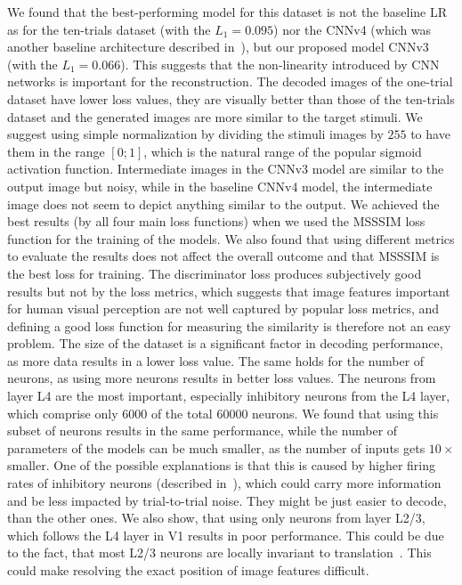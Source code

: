 We found that the best-performing model for this dataset is not the baseline LR as for the ten-trials dataset (with the $L_1 = 0.095$) nor the CNNv4 (which was another baseline architecture described in~\citep{zhang2020reconstruction}), but our proposed model CNNv3 (with the $L_1=0.066$). This suggests that the non-linearity introduced by CNN networks is important for the reconstruction.
The decoded images of the one-trial dataset have lower loss values, they are visually better than those of the ten-trials dataset and the generated images are more similar to the target stimuli. We suggest using simple normalization by dividing the stimuli images by $255$ to have them in the range $[0;1]$, which is the natural range of the popular sigmoid activation function.
Intermediate images in the CNNv3 model are similar to the output image but noisy, while in the baseline CNNv4 model, the intermediate image does not seem to depict anything similar to the output.
We achieved the best results (by all four main loss functions) when we used the MSSSIM loss function for the training of the models. We also found that using different metrics to evaluate the results does not affect the overall outcome and that MSSSIM is the best loss for training. The discriminator loss produces subjectively good results but not by the loss metrics, which suggests that image features important for human visual perception are not well captured by popular loss metrics, and defining a good loss function for measuring the similarity is therefore not an easy problem.
The size of the dataset is a significant factor in decoding performance, as more data results in a lower loss value. The same holds for the number of neurons, as using more neurons results in better loss values.
The neurons from layer L4 are the most important, especially inhibitory neurons from the L4 layer, which comprise only 6000 of the total 60000 neurons. We found that using this subset of neurons results in the same performance, while the number of parameters of the models can be much smaller, as the number of inputs gets $10\times$ smaller. One of the possible explanations is that this is caused by higher firing rates of inhibitory neurons (described in~\citep{antolik2018comprehensive}), which could carry more information and be less impacted by trial-to-trial noise. They might be just easier to decode, than the other ones. We also show, that using only neurons from layer L2/3, which follows the L4 layer in V1 results in poor performance. This could be due to the fact, that most L2/3 neurons are locally invariant to translation~\citep{Wilmes_2019}. This could make resolving the exact position of image features difficult.


